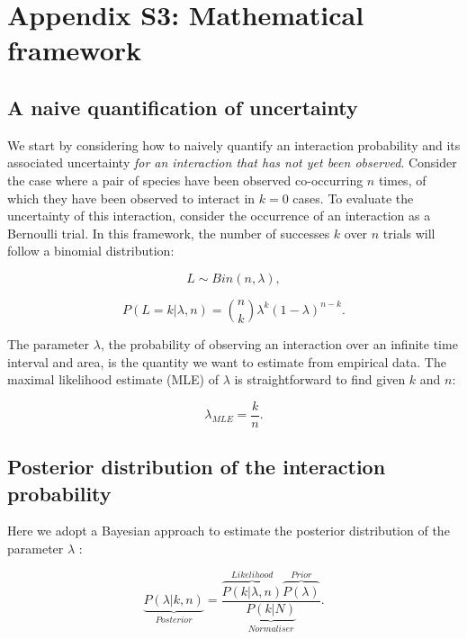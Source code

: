 \documentclass[12pt]{article}
\begin{document}
\clearpage

\section*{Appendix S3: Mathematical framework}

  \subsection*{A naive quantification of uncertainty}

    We start by considering how to naively quantify an interaction probability and its associated uncertainty \emph{for an interaction that has not yet been observed}. Consider the case where a pair of species have been observed co-occurring $n$ times, of which they have been observed to interact in $k = 0$ cases. To evaluate the uncertainty of this interaction, consider the occurrence of an interaction as a Bernoulli trial. In this framework, the number of successes $k$ over $n$ trials will follow a binomial distribution: 
        
        \begin{equation}
          L \sim Bin(n,\lambda) ,
        \end{equation}


        \begin{equation}
           P(L = k|\lambda,n) = {n \choose k}\lambda^k(1-\lambda)^{n-k} . 
           \label{likelihood}
        \end{equation}

    \noindent The parameter $\lambda$, the probability of observing an interaction over an infinite time interval and area, is the quantity we want to estimate from empirical data. 
    The maximal likelihood estimate (MLE) of $\lambda$ is straightforward to find given $k$ and $n$:

        \begin{equation}
          \lambda_{MLE} = \frac{k}{n}  .
          \label{theta_MLE}
        \end{equation}


  \subsection*{Posterior distribution of the interaction probability}

    Here we adopt a Bayesian approach to estimate the posterior distribution of the parameter $\lambda$ :

    \begin{equation}
      \underbrace{P(\lambda|k,n)}_{Posterior} = \frac{\overbrace{P(k|\lambda,n)}^{Likelihood}\overbrace{P(\lambda)}^{Prior}}{\underbrace{P(k|N)}_{Normaliser}} .
      \label{posterior}
    \end{equation}
\end{document}
